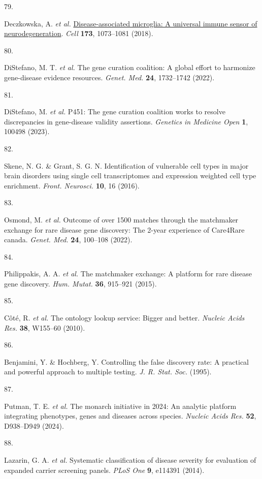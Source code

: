 \documentclass[
]{article}
\newlength{\cslhangindent}
\newlength{\csllabelwidth}
\newenvironment{CSLReferences}[2] %
 {\begin{list}{}{%
  \setlength{\itemindent}{0pt}
  \setlength{\leftmargin}{0pt}
  \setlength{\parsep}{0pt}
  \ifodd #1
   \setlength{\leftmargin}{\cslhangindent}
   \setlength{\itemindent}{-1\cslhangindent}
  \fi
  \setlength{\itemsep}{#2\baselineskip}}}
 {\end{list}}
\newcommand{\CSLLeftMargin}[1]{\parbox[t]{\csllabelwidth}{\strut#1\strut}}
\newcommand{\CSLRightInline}[1]{\parbox[t]{\linewidth - \csllabelwidth}{\strut#1\strut}}
\begin{document}
\begin{CSLReferences}{0}{0}
\CSLLeftMargin{79. }%
\CSLRightInline{Deczkowska, A. \emph{et al.}
\href{https://doi.org/10.1016/j.cell.2018.05.003}{Disease-associated
microglia: A universal immune sensor of neurodegeneration}. \emph{Cell}
\textbf{173}, 1073--1081 (2018).}

\CSLLeftMargin{80. }%
\CSLRightInline{DiStefano, M. T. \emph{et al.} The gene curation
coalition: A global effort to harmonize gene-disease evidence resources.
\emph{Genet. Med.} \textbf{24}, 1732--1742 (2022).}

\CSLLeftMargin{81. }%
\CSLRightInline{DiStefano, M. \emph{et al.} P451: The gene curation
coalition works to resolve discrepancies in gene-disease validity
assertions. \emph{Genetics in Medicine Open} \textbf{1}, 100498 (2023).}

\CSLLeftMargin{82. }%
\CSLRightInline{Skene, N. G. \& Grant, S. G. N. Identification of
vulnerable cell types in major brain disorders using single cell
transcriptomes and expression weighted cell type enrichment.
\emph{Front. Neurosci.} \textbf{10}, 16 (2016).}

\CSLLeftMargin{83. }%
\CSLRightInline{Osmond, M. \emph{et al.} Outcome of over 1500 matches
through the matchmaker exchange for rare disease gene discovery: The
2-year experience of {Care4Rare} canada. \emph{Genet. Med.} \textbf{24},
100--108 (2022).}

\CSLLeftMargin{84. }%
\CSLRightInline{Philippakis, A. A. \emph{et al.} The matchmaker
exchange: A platform for rare disease gene discovery. \emph{Hum. Mutat.}
\textbf{36}, 915--921 (2015).}

\CSLLeftMargin{85. }%
\CSLRightInline{Côté, R. \emph{et al.} The ontology lookup service:
Bigger and better. \emph{Nucleic Acids Res.} \textbf{38}, W155--60
(2010).}

\CSLLeftMargin{86. }%
\CSLRightInline{Benjamini, Y. \& Hochberg, Y. Controlling the false
discovery rate: A practical and powerful approach to multiple testing.
\emph{J. R. Stat. Soc.} (1995).}

\CSLLeftMargin{87. }%
\CSLRightInline{Putman, T. E. \emph{et al.} The monarch initiative in
2024: An analytic platform integrating phenotypes, genes and diseases
across species. \emph{Nucleic Acids Res.} \textbf{52}, D938--D949
(2024).}

\CSLLeftMargin{88. }%
\CSLRightInline{Lazarin, G. A. \emph{et al.} Systematic classification
of disease severity for evaluation of expanded carrier screening panels.
\emph{PLoS One} \textbf{9}, e114391 (2014).}

\end{CSLReferences}
\end{document}
